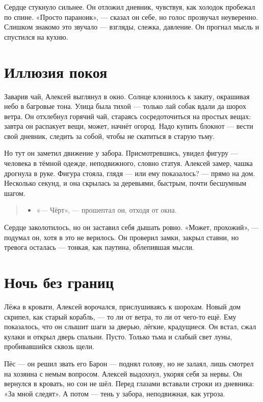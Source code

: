 \documentclass[12pt,a4paper]{book}
\newenvironment{dialogue}{\begin{quote}\itshape\begin{itemize}\item[]}{\end{itemize}\end{quote}}
\begin{document}
Сердце стукнуло сильнее. Он отложил дневник, чувствуя, как холодок пробежал по спине. «Просто параноик», — сказал он себе, но голос прозвучал неуверенно. Слишком знакомо это звучало — взгляды, слежка, давление. Он прогнал мысль и спустился на кухню.

\section{Иллюзия покоя}

Заварив чай, Алексей выглянул в окно. Солнце клонилось к закату, окрашивая небо в багровые тона. Улица была тихой — только лай собак вдали да шорох ветра. Он отхлебнул горячий чай, стараясь сосредоточиться на простых вещах: завтра он распакует вещи, может, начнёт огород. Надо купить блокнот — вести свой дневник, следить за собой, чтобы не скатиться в старую тьму.

Но тут он заметил движение у забора. Присмотревшись, увидел фигуру — человека в тёмной одежде, неподвижного, словно статуя. Алексей замер, чашка дрогнула в руке. Фигура стояла, глядя — или ему показалось? — прямо на дом. Несколько секунд, и она скрылась за деревьями, быстрым, почти бесшумным шагом.

\begin{dialogue}
«— Чёрт», — прошептал он, отходя от окна.
\end{dialogue}

Сердце заколотилось, но он заставил себя дышать ровно. «Может, прохожий», — подумал он, хотя в это не верилось. Он проверил замки, закрыл ставни, но тревога осталась — тонкая, как паутина, облепившая мысли.

\section{Ночь без границ}

Лёжа в кровати, Алексей ворочался, прислушиваясь к шорохам. Новый дом скрипел, как старый корабль, — то ли от ветра, то ли от чего-то ещё. Ему показалось, что он слышит шаги за дверью, лёгкие, крадущиеся. Он встал, сжал кулаки и открыл дверь спальни. Пусто. Только тьма и слабый свет луны, пробивавшийся сквозь щели.

Пёс — он решил звать его Барон — поднял голову, но не залаял, лишь смотрел на хозяина с немым вопросом. Алексей выдохнул, укоряя себя за нервы. Он вернулся в кровать, но сон не шёл. Перед глазами вставали строки из дневника: «За мной следят». А потом — тень у забора, неподвижная, как угроза.
\end{document}
